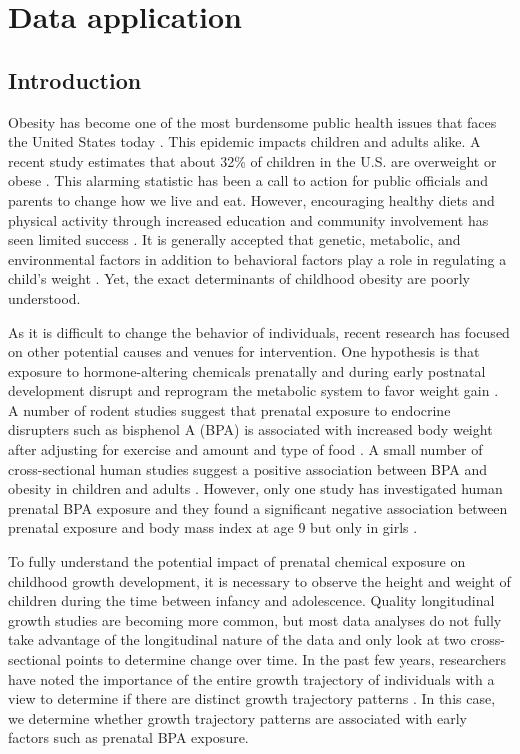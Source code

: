 \chapter{Data application}
\label{chap:data}
\section{Introduction}
Obesity has become one of the most burdensome public health issues that faces the United States today \cite{surgeon2001}.  This epidemic impacts children and adults alike.  A recent study estimates that about 32\% of children in the U.S. are overweight or obese \cite{ogden2008}. This alarming statistic has been a call to action for public officials and parents to change how we live and eat. However, encouraging healthy diets and physical activity through increased education and community involvement has seen limited success \cite{hardeman2000,lombard2009}.  It is generally accepted that genetic, metabolic, and environmental factors in addition to behavioral factors play a role in regulating a child's weight \cite{surgeon2001}. Yet, the exact determinants of childhood obesity are poorly understood.

As it is difficult to change the behavior of individuals, recent research has focused on other potential causes and venues for intervention. One hypothesis is that exposure to hormone-altering chemicals prenatally and during early postnatal development disrupt and reprogram the metabolic system to favor weight gain \cite{tuma2007}. A number of rodent studies suggest that prenatal exposure to endocrine disrupters such as bisphenol A (BPA) is associated with increased body weight after adjusting for exercise and amount and type of food \cite{rubin2001,akingbemi2004,hiyama2011, howdeshell1999,miyawaki2007,somm2009,wei2011,xu2011}. A small number of cross-sectional human studies suggest a positive association between BPA and obesity in children and adults \cite{carwile2011,shankar2012,trasande2012}. However, only one study has investigated human prenatal BPA exposure and they found a significant negative association between prenatal exposure and body mass index at age 9 but only in girls \cite{harley2013}.
 
 To fully understand the potential impact of prenatal chemical exposure on childhood growth development, it is necessary to observe the height and weight of children during the time between infancy and adolescence. Quality longitudinal growth studies are becoming more common, but most data analyses do not fully take advantage of the longitudinal nature of the data and only look at two cross-sectional points to determine change over time. In the past few years, researchers have noted the importance of the entire growth trajectory of individuals with a view to determine if there are distinct growth trajectory patterns \cite{pryor2011,carter2012,li2007,garden2012}. In this case, we determine whether growth trajectory patterns are associated with early factors such as prenatal BPA exposure.

